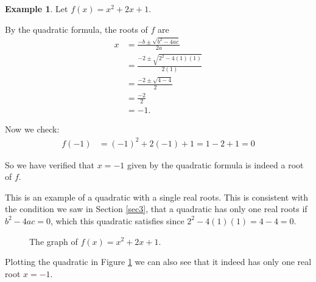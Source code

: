 \documentclass[12pt, letterpaper]{article}
\theoremstyle{definition}
\newtheorem{ex}[thm]{Example}
\begin{document}
\begin{ex}
  Let \(f(x) = x^2 + 2x + 1\).

  By the quadratic formula, the roots of \(f\) are
  \begin{align*}
  x &= \frac{-b \pm \sqrt{b^2 - 4ac}}{2a} \\
    &= \frac{-2 \pm \sqrt{2^2 - 4(1)(1)}}{2(1)} \\
    &= \frac{-2 \pm \sqrt{4 - 4}}{2} \\
    &= \frac{-2}{2} \\
    &= -1.
  \end{align*}

  Now we check:
  \begin{align*}
    f(-1) &= (-1)^2 + 2(-1) + 1 = 1 - 2 + 1 = 0
  \end{align*}

  So we have verified that \(x=-1\) given by the quadratic formula is indeed a root of \(f\).

  This is an example of a quadratic with a single real roots.
  This is consistent with the condition we saw in Section \ref{sec3},
  that a quadratic has only one real roots if \(b^2 - 4a c = 0\),
  which this quadratic satisfies since \(2^2 - 4(1)(1) = 4 - 4 = 0\).

  \begin{figure}[ht]
      \centering
      \caption{The graph of $f(x)=x^2+2x+1$.}
      \label{fig:graph2}
  \end{figure}

  Plotting the quadratic in Figure \ref{fig:graph2} we can also see that it indeed has only
  one real root \(x=-1\).
\end{ex}
\end{document}
